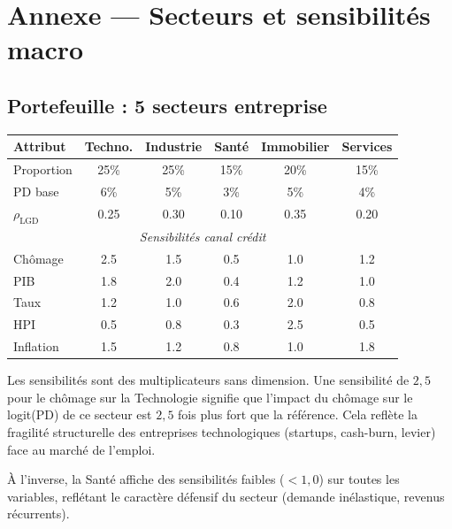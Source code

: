 \documentclass[12pt,a4paper]{article}
\begin{document}
\newpage
\section{Annexe --- Secteurs et sensibilit\'es macro}
\label{sec:annexe}

\subsection{Portefeuille : 5 secteurs entreprise}

\begin{longtable}{lccccc}
\toprule
\textbf{Attribut} & \textbf{Techno.} & \textbf{Industrie} & \textbf{Sant\'e} & \textbf{Immobilier} & \textbf{Services} \\
\midrule
\endhead
Proportion              & 25\%  & 25\%  & 15\%  & 20\%  & 15\% \\
PD base                 & 6\%   & 5\%   & 3\%   & 5\%   & 4\% \\
$\rho_{\text{LGD}}$     & 0.25  & 0.30  & 0.10  & 0.35  & 0.20 \\
\midrule
\multicolumn{6}{c}{\textit{Sensibilit\'es canal cr\'edit}} \\
\midrule
Ch\^omage   & 2.5 & 1.5 & 0.5 & 1.0 & 1.2 \\
PIB         & 1.8 & 2.0 & 0.4 & 1.2 & 1.0 \\
Taux        & 1.2 & 1.0 & 0.6 & 2.0 & 0.8 \\
HPI         & 0.5 & 0.8 & 0.3 & 2.5 & 0.5 \\
Inflation   & 1.5 & 1.2 & 0.8 & 1.0 & 1.8 \\
\bottomrule
\end{longtable}

\begin{interpretbox}
Les sensibilit\'es sont des multiplicateurs sans dimension. Une sensibilit\'e de $2{,}5$ pour le ch\^omage sur la Technologie signifie que l'impact du ch\^omage sur le logit(PD) de ce secteur est $2{,}5$ fois plus fort que la r\'ef\'erence. Cela refl\`ete la fragilit\'e structurelle des entreprises technologiques (startups, cash-burn, levier) face au march\'e de l'emploi.

\`A l'inverse, la Sant\'e affiche des sensibilit\'es faibles ($< 1{,}0$) sur toutes les variables, refl\'etant le caract\`ere d\'efensif du secteur (demande in\'elastique, revenus r\'ecurrents).
\end{interpretbox}
\end{document}
